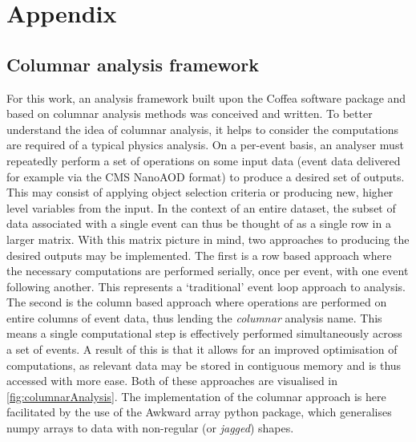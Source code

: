 \chapter{Appendix}
\section{Columnar analysis framework}
\label{sec:analysisFramework}
For this work, an analysis framework built upon the \textsf{Coffea} \cite{Coffea} software package and based on columnar analysis methods was conceived and written. To better understand the idea of columnar analysis, it helps to consider the computations are required of a typical physics analysis. On a per-event basis, an analyser must repeatedly perform a set of operations on some input data (event data delivered for example via the CMS \textsf{NanoAOD} \cite{NANOAOD} format) to produce a desired set of outputs. This may consist of applying object selection criteria or producing new, higher level variables from the input. In the context of an entire dataset, the subset of data associated with a single event can thus be thought of as a single row in a larger matrix. With this matrix picture in mind, two approaches to producing the desired outputs may be implemented. The first is a row based approach where the necessary computations are performed serially, once per event, with one event following another. This represents a `traditional' event loop approach to analysis. The second is the column based approach where operations are performed on entire columns of event data, thus lending the \textit{columnar} analysis name. This means a single computational step is effectively performed simultaneously across a set of events. A result of this is that it allows for an improved optimisation of computations, as relevant data may be stored in contiguous memory and is thus accessed with more ease. Both of these approaches are visualised in \autoref{fig:columnarAnalysis}. The implementation of the columnar approach is here facilitated by the use of the \textsf{Awkward array} \cite{AwkwardArrays} python package, which generalises \textsf{numpy} \cite{Numpy} arrays to data with non-regular (or \textit{jagged}) shapes. \\
\\
